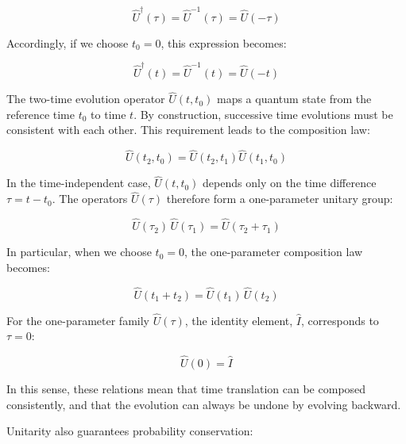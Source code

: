 \begin{equation}
    \hat{U}^{\dagger}(\tau)= \hat{U}^{-1}(\tau) = \hat{U}(-\tau)
\label{time_evolution_reversible_tau}
\end{equation}

Accordingly, if we choose $t_0=0$, this expression becomes:

\begin{equation}
    \hat{U}^{\dagger}(t)= \hat{U}^{-1}(t)= \hat{U}(-t)
\label{time_evolution_reversible_deg}
\end{equation}

The two-time evolution operator $\hat{U}(t,t_0)$ maps a quantum state from the reference time $t_0$ to time $t$.
By construction, successive time evolutions must be consistent with each other.
This requirement leads to the composition law:

\begin{equation}
    \hat{U}(t_2,t_0)=\hat{U}(t_2,t_1)\hat{U}(t_1,t_0)
\label{composition_law_time_evolution}
\end{equation}

In the time-independent case, $\hat{U}(t,t_0)$ depends only on the time difference $\tau=t-t_0$.
The operators $\hat{U}(\tau)$ therefore form a one-parameter unitary group:

\begin{equation}
    \hat{U}(\tau_2)\,\hat{U}(\tau_1)=\hat{U}(\tau_2+\tau_1)
\label{time_evolution_group_property_tau}
\end{equation}

In particular, when we choose $t_0=0$, the one-parameter composition law becomes:

\begin{equation}
    \hat{U}(t_1+t_2)=\hat{U}(t_1)\,\hat{U}(t_2)
\label{time_evolution_group_property}
\end{equation}

For the one-parameter family $\hat{U}(\tau)$, the identity element, $\hat{I}$, corresponds to $\tau=0$:

\begin{equation}
    \hat{U}(0)=\hat{I}
\label{time_evolution_identity}
\end{equation}

In this sense, these relations mean that time translation can be composed consistently, and that the evolution can always be undone by evolving backward.

Unitarity also guarantees probability conservation:

